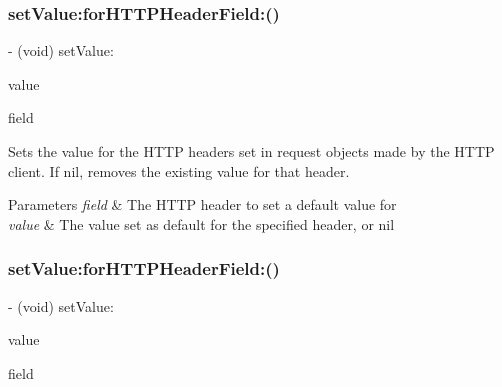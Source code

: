 \subsubsection{\texorpdfstring{set\+Value\+:for\+H\+T\+T\+P\+Header\+Field\+:()}{setValue:forHTTPHeaderField:()}\hspace{0.1cm}{\footnotesize\ttfamily [1/3]}}
{\footnotesize\ttfamily -\/ (void) set\+Value\+: \begin{DoxyParamCaption}\item[{(nullable N\+S\+String $\ast$)}]{value }\item[{forHTTPHeaderField:(N\+S\+String $\ast$)}]{field }\end{DoxyParamCaption}}

Sets the value for the H\+T\+TP headers set in request objects made by the H\+T\+TP client. If {\ttfamily nil}, removes the existing value for that header.


\begin{DoxyParams}{Parameters}
{\em field} & The H\+T\+TP header to set a default value for \\
\hline
{\em value} & The value set as default for the specified header, or {\ttfamily nil} \\
\hline
\end{DoxyParams}
\mbox{\label{interface_a_f_h_t_t_p_request_serializer_a782d460accdab9c8682550a77f167898}} 
\subsubsection{\texorpdfstring{set\+Value\+:for\+H\+T\+T\+P\+Header\+Field\+:()}{setValue:forHTTPHeaderField:()}\hspace{0.1cm}{\footnotesize\ttfamily [2/3]}}
{\footnotesize\ttfamily -\/ (void) set\+Value\+: \begin{DoxyParamCaption}\item[{(nullable N\+S\+String $\ast$)}]{value }\item[{forHTTPHeaderField:(N\+S\+String $\ast$)}]{field }\end{DoxyParamCaption}}

